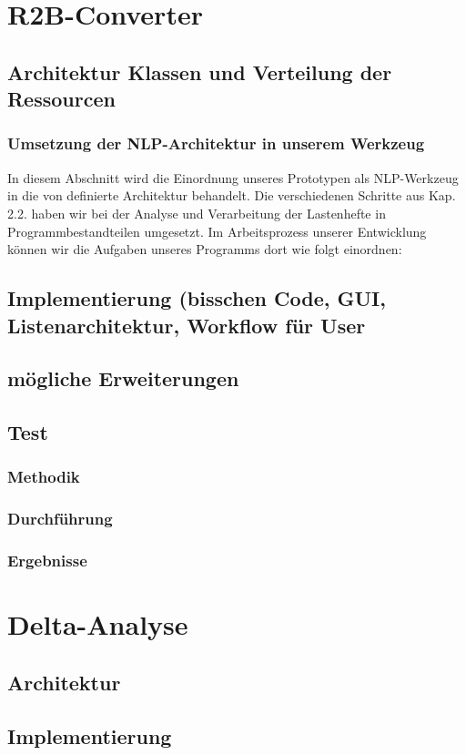 \documentclass[12pt]{report}
\begin{document}
\chapter{R2B-Converter}
\section{Architektur Klassen und Verteilung der Ressourcen}
\subsection{Umsetzung der NLP-Architektur in unserem Werkzeug}
In diesem Abschnitt wird die Einordnung unseres Prototypen als NLP-Werkzeug in die von \cite{cop04} definierte Architektur behandelt. Die verschiedenen Schritte aus Kap. 2.2. haben wir bei der Analyse und Verarbeitung der Lastenhefte in Programmbestandteilen umgesetzt. Im Arbeitsprozess unserer Entwicklung können wir die Aufgaben unseres Programms dort wie folgt einordnen:
\section{Implementierung (bisschen Code, GUI, Listenarchitektur, Workflow für User}
\section{mögliche Erweiterungen}
\section{Test}
\subsection{Methodik}
\subsection{Durchführung}
\subsection{Ergebnisse}
\chapter{Delta-Analyse}
\section{Architektur}
\section{Implementierung}
\end{document}
